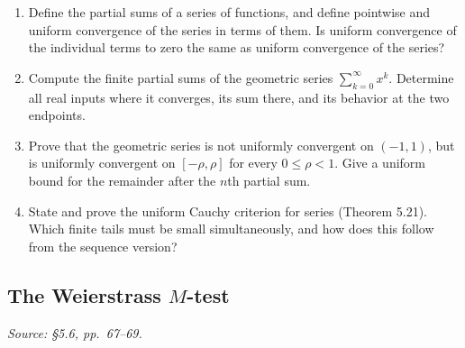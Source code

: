 \begin{enumerate}[resume]
  \item Define the partial sums of a series of functions, and define
    pointwise and uniform convergence of the series in terms of them.
    Is uniform convergence of the individual terms to zero the same
    as uniform convergence of the series?

  \item Compute the finite partial sums of the geometric series
    \(\sum_{k=0}^{\infty}x^k\). Determine all real inputs where
    it converges, its sum there, and its behavior at the two endpoints.

  \item Prove that the geometric series is not uniformly convergent
    on \((-1,1)\), but is uniformly convergent on \([-\rho,\rho]\)
    for every \(0\leq\rho<1\). Give a uniform bound for the
    remainder after the \(n\)th partial sum.

  \item State and prove the uniform Cauchy criterion for series
    (Theorem 5.21). Which finite tails must be small simultaneously,
    and how does this follow from the sequence version?
\end{enumerate}

\subsection{The Weierstrass \texorpdfstring{\(M\)}{M}-test}
\textit{Source: \S5.6, pp.~67--69.}

